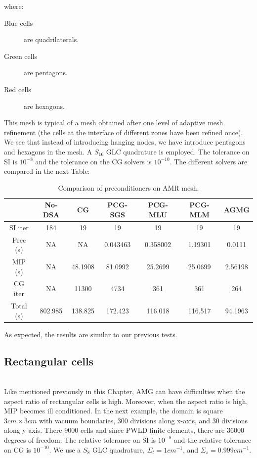where:
\begin{description}
  \item[Blue cells] are quadrilaterals.
  \item[Green cells] are pentagons.
  \item[Red cells] are hexagons.
\end{description}
This mesh is typical of a mesh obtained after one level of adaptive mesh
refinement (the cells at the interface of different zones have been refined
once). We see that instead of introducing hanging nodes, we have introduce
pentagons and hexagons in the mesh.
A $S_{16}$ GLC quadrature is employed. The tolerance on SI is $10^{-8}$ and
the tolerance on the CG solvers is $10^{-10}$.
The different solvers are compared in the next Table:
\begin{table}[H]
  \caption{Comparison of preconditioners on AMR mesh.}
  \begin{center}
    \begin{tabular}{|c|c|c|c|c|c|c|}
      \hline
       & No-DSA & CG & PCG-SGS & PCG-MLU & PCG-MLM & AGMG \\
      \hline
      SI iter    & 184     & 19      & 19       & 19      & 19       & 19 \\
      Prec (s)   & NA      & NA      & 0.043463 & 0.358002 & 1.19301 & 0.0111\\
      MIP (s)    & NA      & 48.1908 & 81.0992  & 25.2699 & 25.0699  & 
      2.56198\\
      CG iter    & NA      & 11300   & 4734     & 361     & 361      & 264 \\
      Total (s)  & 802.985 & 138.825 & 172.423  & 116.018 & 116.517  &
      94.1963\\
      \hline
    \end{tabular}
  \end{center}
\end{table}
As expected, the results are similar to our previous tests.

\subsection{Rectangular cells}
\emph{}\\
Like mentioned previously in this Chapter, AMG can have difficulties when the
aspect ratio of rectangular cells is high. Moreover, when the aspect ratio is high,
MIP becomes ill conditioned. In the next example, the domain is 
square $3cm \times 3cm$ with vacuum boundaries, 300 divisions along x-axis, 
and 30 divisions along y-axis. There 9000 cells and since PWLD finite elements, 
there are 36000 degrees of freedom. The relative tolerance on SI is $10^{-8}$ 
and the relative tolerance on CG is $10^{-10}$. We use a $S_{8}$ GLC quadrature, 
$\Sigma_t = 1 cm^{-1}$, and $\Sigma_s = 0.999 cm^{-1}$.

